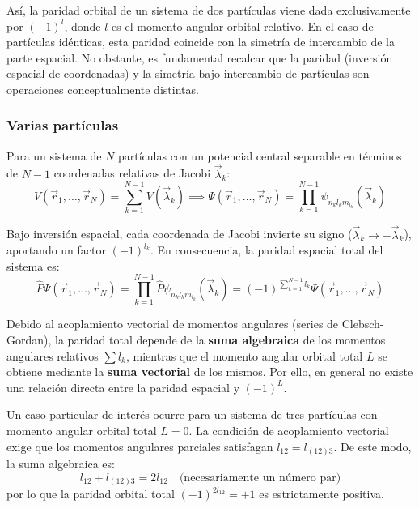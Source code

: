 Así, la paridad orbital de un sistema de dos partículas viene dada exclusivamente por $(-1)^l$, donde $l$ es el momento angular orbital relativo. En el caso de partículas idénticas, esta paridad coincide con la simetría de intercambio de la parte espacial. No obstante, es fundamental recalcar que la paridad (inversión espacial de coordenadas) y la simetría bajo intercambio de partículas son operaciones conceptualmente distintas.

\subsubsection{Varias partículas}

Para un sistema de $N$ partículas con un potencial central separable en términos de $N-1$ coordenadas relativas de Jacobi $\vec{\lambda}_k$:
\begin{equation}
    V(\vec{r}_1, \dots, \vec{r}_N) = \sum_{k=1}^{N-1} V(\vec{\lambda}_k) \implies \Psi(\vec{r}_1, \dots, \vec{r}_N) = \prod_{k=1}^{N-1} \psi_{n_k l_k m_{l_k}}(\vec{\lambda}_k)
\end{equation}

Bajo inversión espacial, cada coordenada de Jacobi invierte su signo ($\vec{\lambda}_k \to -\vec{\lambda}_k$), aportando un factor $(-1)^{l_k}$. En consecuencia, la paridad espacial total del sistema es:
\begin{equation}
    \hat{P} \Psi(\vec{r}_1, \dots, \vec{r}_N) = \prod_{k=1}^{N-1} \hat{P} \psi_{n_k l_k m_{l_k}}(\vec{\lambda}_k) = (-1)^{\sum_{k=1}^{N-1} l_k} \Psi(\vec{r}_1, \dots, \vec{r}_N)
\end{equation}

Debido al acoplamiento vectorial de momentos angulares (series de Clebsch-Gordan), la paridad total depende de la \textbf{suma algebraica} de los momentos angulares relativos $\sum l_k$, mientras que el momento angular orbital total $L$ se obtiene mediante la \textbf{suma vectorial} de los mismos. Por ello, en general no existe una relación directa entre la paridad espacial y $(-1)^L$.

Un caso particular de interés ocurre para un sistema de tres partículas con momento angular orbital total $L = 0$. La condición de acoplamiento vectorial exige que los momentos angulares parciales satisfagan $l_{12} = l_{(12)3}$. De este modo, la suma algebraica es:
\begin{equation}
    l_{12} + l_{(12)3} = 2 l_{12} \quad \text{(necesariamente un número par)}
\end{equation}
por lo que la paridad orbital total $(-1)^{2 l_{12}} = +1$ es estrictamente positiva.

